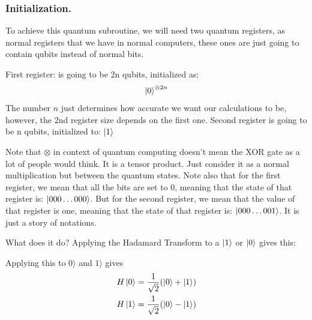 \subsubsection{Initialization.}
To achieve this quantum subroutine, we will need two quantum registers, as normal registers that we have in normal computers, these ones are just going to contain qubits instead of normal bits.

First register: is going to be 2n qubits, initialized as:
\[
\ket{0}^{\otimes 2n}
\]
The number \( n \) just determines how accurate we want our calculations to be, however, the 2nd register size depends on the first one.\nl
Second register is going to be n qubits, initialized to: $\ket1$ 

Note that \( \otimes \) in context of quantum computing doesn’t mean the XOR gate as a lot of people would think. It is a tensor product. Just consider it as a normal multiplication but between the quantum states.\nl
Note also that for the first register, we mean that all the bits are set to 0, meaning that the state of that register is: \( \ket{000\ldots000} \).\nl
But for the second register, we mean that the value of that register is one, meaning that the state of that register is: \( \ket{000\ldots001} \). It is just a story of notations.





What does it do? Applying the Hadamard Transform to a $\ket{1}$ or $\ket{0}$ gives this:

\begin{example} Applying this to $0\rangle$ and $1 \rangle$ gives     
\begin{align*}
H\ket{0} = \frac{1}{\sqrt{2}}(\ket{0} + \ket{1})\\
H\ket{1} = \frac{1}{\sqrt{2}}(\ket{0} - \ket{1})
\end{align*}
\end{example}


